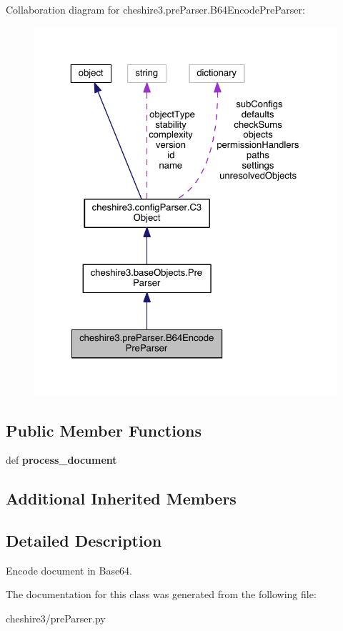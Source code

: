 Collaboration diagram for cheshire3.\-pre\-Parser.\-B64\-Encode\-Pre\-Parser\-:
\nopagebreak
\begin{figure}[H]
\begin{center}
\leavevmode
\includegraphics[width=325pt]{classcheshire3_1_1pre_parser_1_1_b64_encode_pre_parser__coll__graph}
\end{center}
\end{figure}
\subsection*{Public Member Functions}
\begin{DoxyCompactItemize}
\item 
\hypertarget{classcheshire3_1_1pre_parser_1_1_b64_encode_pre_parser_a4e231f7a5705f8ea696877cfbda9fd43}{def {\bfseries process\-\_\-document}}\label{classcheshire3_1_1pre_parser_1_1_b64_encode_pre_parser_a4e231f7a5705f8ea696877cfbda9fd43}

\end{DoxyCompactItemize}
\subsection*{Additional Inherited Members}


\subsection{Detailed Description}
\begin{DoxyVerb}Encode document in Base64.\end{DoxyVerb}
 

The documentation for this class was generated from the following file\-:\begin{DoxyCompactItemize}
\item 
cheshire3/pre\-Parser.\-py\end{DoxyCompactItemize}
